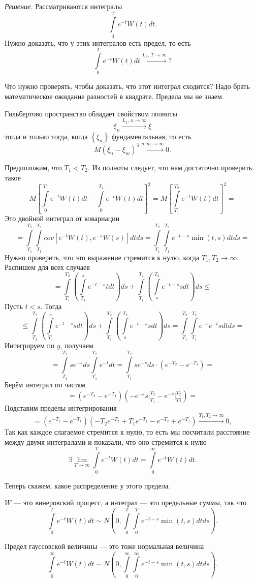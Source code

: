 \textit{Решение.}
Рассматриваются интегралы
$$ \int \limits_0^T e^{-t} W \left( t \right) dt.$$
Нужно доказать, что у этих интегралов есть предел, то есть
$$ \int \limits_0^T e^{-t} W \left( t \right) dt \overset{L_2, \, T \to \infty }{ \to }?$$

Что нужно проверять, чтобы доказать, что этот интеграл сходится?
Надо брать математическое ожидание разностей в квадрате.
Предела мы не знаем.

Гильбертово пространство обладает свойством полноты
$$ \xi_n \overset{L_2, \, n \to \infty }{ \to }
  \xi$$
тогда и только тогда, когда $ \left\{ \xi_n \right\} $ фундаментальная, то есть
$$M \left( \xi_n - \xi_m \right)^3 \overset{n, m \to \infty }{ \to }
  0.$$

Предположим, что $T_1 < T_2$.
Из полноты следует, что нам достаточно проверить такое
$$M \left[
    \int \limits_0^{T_1} e^{-t} W \left( t \right) dt -
    \int \limits_0^{T_2} e^{-t} W \left( t \right) dt \right]^2 =
  M \left[ \int \limits_{T_1}^{T_2} e^{-t} W \left( t \right) dt \right]^2 =$$
Это двойной интеграл от ковариации
$$= \int \limits_{T_1}^{T_2} \int \limits_{T_1}^{T_2}
    cov \left[ e^{-t} W \left( t \right), e^{-s} W \left( s \right) \right] dtds =
  \int \limits_{T_1}^{T_2} \int \limits_{T_1}^{T_2}
    e^{-t-s} \min \left( t, s \right) dtds =$$
Нужно проверить, что это выражение стремится к нулю, когда $T_1, T_2 \to \infty $.
Распишем для всех случаев
$$= \int \limits_{T_1}^{T_2} \left( \int \limits_{T_1}^s e^{-t-s} tdt \right) ds +
  \int \limits_{T_1}^{T_2} \left( \int \limits_s^{T_2} e^{-t-s} sdt \right) ds \leq $$
Пусть $t < s$.
Тогда
$$ \leq \int \limits_{T_1}^{T_2} \left( \int \limits_{T_1}^s e^{-t-s} sdt \right) ds +
  \int \limits_{T_1}^{T_2} \left( \int \limits_s^{T_2} e^{-t-s} sdt \right) ds =
  \int \limits_{T_1}^{T_2} \int \limits_{T_1}^{T_2} e^{-s} e^{-t} sdtds =$$
Интегрируем по $y$, получаем
$$= \int \limits_{T_1}^{T_2} se^{-s} ds \int \limits_{T_1}^{T_2} e^{-t} dt =
  \int \limits_{T_1}^{T_2} se^{-s} ds \cdot \left( e^{-T_2} - e^{-T_1} \right) =$$
Берём интеграл по частям
$$= \left( e^{-T_2} - e^{-T_1} \right)
  \left( \left. -e^{-s} s \right|_{T_1}^{T_2} - \left. e^{-s} \right|_{T1}^{T_2} \right) =$$
Подставим пределы интегрирования
$$= \left( e^{-T_2} - e^{-T_1} \right)
  \left( -T_2 e^{-T_2} + T_1 e^{-T_1} - e^{-T_2} + e^{-T_1} \right)
  \overset{T_1, T_2 \to \infty }{ \to } 0,$$
Так как каждое слагаемое стремится к нулю,
то есть мы посчитали расстояние между двумя интегралами и показали, что оно стремится к нулю
$$ \exists \lim \limits_{T \to \infty } \int \limits_0^T e^{-t} W \left( t \right) dt =
  \int \limits_0^{ \infty } e^{-t} W \left( t \right) dt.$$

Теперь скажем, какое распределение у этого предела.

$W$ --- это винеровский процесс, а интеграл --- это предельные суммы, так что
$$ \int \limits_0^T e^{-t} W \left( t \right) dt \sim
  N \left( 0, \int \limits_0^T \int \limits_0^T e^{-t-s} \min \left( t, s \right) dtds \right).$$

Предел гауссовской величины --- это тоже нормальная величина
$$ \int \limits_0^{ \infty } e^{-t} W \left( t \right) dt \sim
  N \left(
    0, \int \limits_0^{ \infty } \int \limits_0^{ \infty } e^{-t-s} \min \left( t, s \right) dtds
  \right).$$
